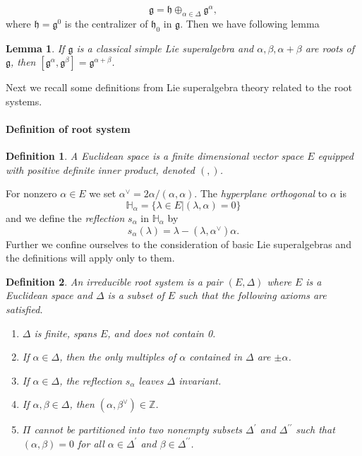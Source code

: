 \documentclass[english]{elsarticle}
\newtheorem{lemma}{Lemma}[section]
\newtheorem{definition}{Definition}[section]
\numberwithin{equation}{section}
\begin{document}
\begin{equation}
\label{eq:5}
\mathfrak{g}=\mathfrak{h}\oplus_{\alpha \in \Delta} \mathfrak{g}^{\alpha},
\end{equation}
where $\mathfrak{h} = \mathfrak{g}^0$ is the centralizer of $\mathfrak{h}_0$ in $\mathfrak{g}$. Then we have following lemma
\begin{lemma}
 If $\mathfrak{g}$ is a classical simple Lie superalgebra and $\alpha,\beta,\alpha+\beta$ are roots of $\mathfrak{g}$, then $[\mathfrak{g}^{\alpha},\mathfrak{g}^{\beta}]=\mathfrak{g}^{\alpha+\beta}$. \\
\end{lemma}

Next we recall some definitions from Lie superalgebra theory related to the root systems.

\paragraph{Definition of root system}

\begin{definition}
A {\it Euclidean space} is a finite dimensional vector space $E$ equipped with positive definite inner product, denoted $(,)$.
\end{definition}
For nonzero $\alpha \in E$ we set $\alpha^{\vee}=2\alpha/(\alpha,\alpha)$. The  {\it hyperplane orthogonal} to $\alpha$ is
\[
\mathbb{H}_{\alpha}=\{\lambda \in E|(\lambda,\alpha)=0\}
\]
and we define the {\it reflection} $s_{\alpha}$ in $\mathbb{H}_{\alpha}$ by
\[
s_{\alpha}(\lambda)=\lambda-(\lambda,\alpha^{\vee})\alpha.
\]
Further we confine ourselves to the consideration of basic Lie superalgebras and the definitions will apply only to them.



\begin{definition}
An {\it irreducible root system} is a pair $(E,\Delta)$ where $E$ is a Euclidean space and $\Delta$ is a subset of $E$ such that the following axioms are satisfied.
\begin{enumerate}
    \item $\Delta$ is finite, spans $E$, and does not contain 0.
    \item If $\alpha \in \Delta$, then the only multiples of $\alpha$ contained in $\Delta$ are $\pm \alpha$.
    \item If $\alpha \in \Delta$, the reflection $s_{\alpha}$ leaves $\Delta$ invariant.
    \item If $\alpha, \beta \in \Delta$, then $(\alpha,\beta^{\vee})\in \mathbb{Z}$.
    \item $\Pi$ cannot be partitioned into two nonempty subsets $\Delta^{\prime}$ and $\Delta^{\prime \prime}$ such that $(\alpha,\beta)=0$ for all $\alpha \in \Delta^{\prime}$ and $\beta \in \Delta^{\prime \prime}$.
\end{enumerate}
\end{definition}
\end{document}
